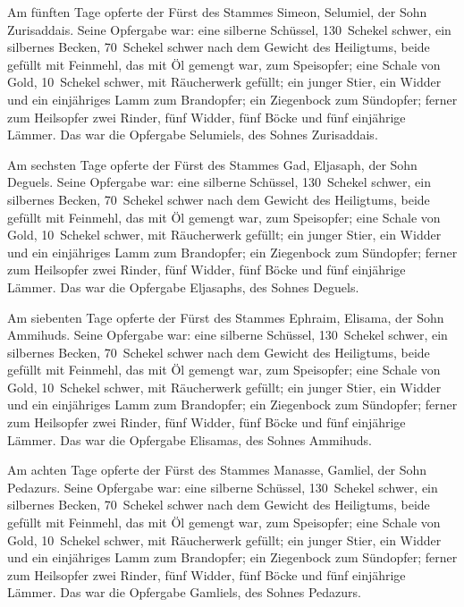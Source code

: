 Am fünften Tage opferte der Fürst des Stammes Simeon,
Selumiel, der Sohn Zurisaddais. Seine Opfergabe war: eine
silberne Schüssel, 130~Schekel schwer, ein silbernes Becken, 70~Schekel
schwer nach dem Gewicht des Heiligtums, beide gefüllt mit Feinmehl, das
mit Öl gemengt war, zum Speisopfer; eine Schale von Gold,
10~Schekel schwer, mit Räucherwerk gefüllt; ein junger
Stier, ein Widder und ein einjähriges Lamm zum Brandopfer;
ein Ziegenbock zum Sündopfer; ferner zum
Heilsopfer zwei Rinder, fünf Widder, fünf Böcke und fünf einjährige
Lämmer. Das war die Opfergabe Selumiels, des Sohnes Zurisaddais.

Am sechsten Tage opferte der Fürst des Stammes Gad,
Eljasaph, der Sohn Deguels. Seine Opfergabe war: eine
silberne Schüssel, 130~Schekel schwer, ein silbernes Becken, 70~Schekel
schwer nach dem Gewicht des Heiligtums, beide gefüllt mit Feinmehl, das
mit Öl gemengt war, zum Speisopfer; eine Schale von Gold,
10~Schekel schwer, mit Räucherwerk gefüllt; ein junger
Stier, ein Widder und ein einjähriges Lamm zum Brandopfer;
ein Ziegenbock zum Sündopfer; ferner zum
Heilsopfer zwei Rinder, fünf Widder, fünf Böcke und fünf einjährige
Lämmer. Das war die Opfergabe Eljasaphs, des Sohnes Deguels.

Am siebenten Tage opferte der Fürst des Stammes Ephraim,
Elisama, der Sohn Ammihuds. Seine Opfergabe war: eine
silberne Schüssel, 130~Schekel schwer, ein silbernes Becken, 70~Schekel
schwer nach dem Gewicht des Heiligtums, beide gefüllt mit Feinmehl, das
mit Öl gemengt war, zum Speisopfer; eine Schale von Gold,
10~Schekel schwer, mit Räucherwerk gefüllt; ein junger
Stier, ein Widder und ein einjähriges Lamm zum Brandopfer;
ein Ziegenbock zum Sündopfer; ferner zum
Heilsopfer zwei Rinder, fünf Widder, fünf Böcke und fünf einjährige
Lämmer. Das war die Opfergabe Elisamas, des Sohnes Ammihuds.

Am achten Tage opferte der Fürst des Stammes Manasse,
Gamliel, der Sohn Pedazurs. Seine Opfergabe war: eine
silberne Schüssel, 130~Schekel schwer, ein silbernes Becken, 70~Schekel
schwer nach dem Gewicht des Heiligtums, beide gefüllt mit Feinmehl, das
mit Öl gemengt war, zum Speisopfer; eine Schale von Gold,
10~Schekel schwer, mit Räucherwerk gefüllt; ein junger
Stier, ein Widder und ein einjähriges Lamm zum Brandopfer;
ein Ziegenbock zum Sündopfer; ferner zum
Heilsopfer zwei Rinder, fünf Widder, fünf Böcke und fünf einjährige
Lämmer. Das war die Opfergabe Gamliels, des Sohnes Pedazurs.

